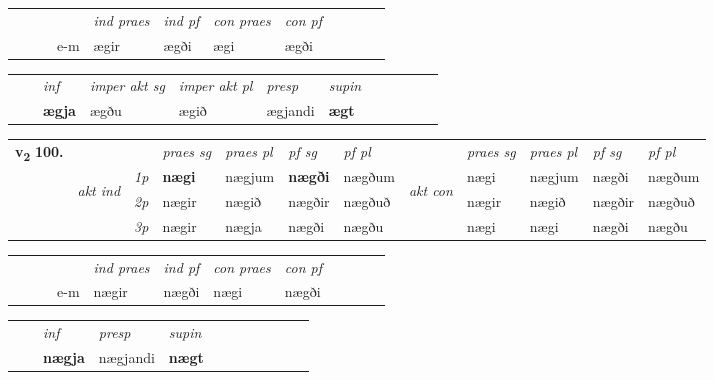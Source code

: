 \begin{tabular}{llllllllllll}
 & &  & &  \textit{ind praes} & \textit{ind pf} & \textit{con praes} & \textit{con pf} \\*
&  & & e-m & ægir & ægði & ægi & ægði \\*
\cmidrule{5-9}
\end{tabular}


\begin{tabular}{llllllllllll}
 & & \textit{inf} & \textit{imper akt sg} & \textit{imper akt pl}   & \textit{presp} & \textit{supin}       \\*
  & & \textbf{ægja} & ægðu  & ægið   & ægjandi &  \textbf{ægt}   \\*
\cmidrule{1-12}
\end{tabular}



\begin{tabular}{llllllllllll} \toprule
\multirow{4}{*}{{{\textbf{v{\textsubscript{2}}} \Large{\textbf{100.}}}}}  & &   &  \textit{praes sg}  & \textit{praes pl}  &\textit{ pf sg} & \textit{pf pl} &  &  \textit{praes sg}  & \textit{praes pl}  & \textit{pf sg} & \textit{pf pl } \\*
	\cmidrule{4-7} \cmidrule{9-12}
 & \multirow{3}{*}{\begin{turn}{90}\textit{akt ind}\end{turn}} & {\textit{1p}} & \textbf{nægi} & nægjum    & \textbf{nægði} & nægðum & \multirow{3}{*}{\begin{turn}{90}\textit{akt con}\end{turn}} &nægi & nægjum & nægði & nægðum\\*
& &  {\textit{2p}} &  nægir  & nægið   & nægðir & nægðuð & & nægir & nægið & nægðir & nægðuð \\*
& &  {\textit{3p}} & nægir & nægja   & nægði & nægðu & & nægi & nægi& nægði & nægðu  \\*
\cmidrule{4-7} \cmidrule{9-12}
\end{tabular}


\begin{tabular}{llllllllllll}
 & &  & &  \textit{ind praes} & \textit{ind pf} & \textit{con praes} & \textit{con pf} \\*
&  & & e-m & nægir & nægði & nægi & nægði \\*
\cmidrule{5-9}
\end{tabular}


\begin{tabular}{llllllllllll}
 & & \textit{inf}     & \textit{presp} & \textit{supin}       \\*
  & & \textbf{nægja}      & nægjandi &  \textbf{nægt}   \\*
\cmidrule{1-12}
\end{tabular}



